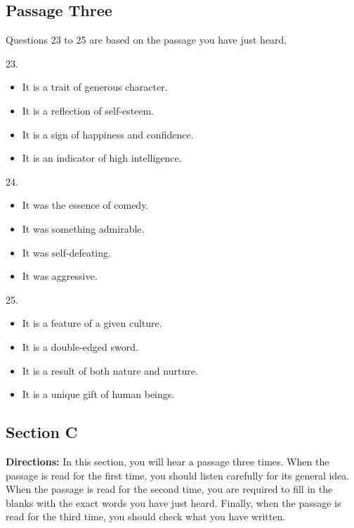 \documentclass[UTF8,11pt]{ctexart}
\begin{document}
\subsection*{Passage Three}


Questions 23 to 25 are based on the passage you have just heard.


23.


\begin{itemize}[leftmargin=2em,itemsep=.2em,topsep=.4em]\item[A.] It is a trait of generous character.
\item[B.] It is a reflection of self-esteem.
\item[C.] It is a sign of happiness and confidence.
\item[D.] It is an indicator of high intelligence.
\end{itemize}

24.


\begin{itemize}[leftmargin=2em,itemsep=.2em,topsep=.4em]\item[A.] It was the essence of comedy.
\item[B.] It was something admirable.
\item[C.] It was self-defeating.
\item[D.] It was aggressive.
\end{itemize}

25.


\begin{itemize}[leftmargin=2em,itemsep=.2em,topsep=.4em]\item[A.] It is a feature of a given culture.
\item[B.] It is a double-edged sword.
\item[C.] It is a result of both nature and nurture.
\item[D.] It is a unique gift of human beings.
\end{itemize}

\subsection*{\textbf{Section C}}


\textbf{Directions:} In this section, you will hear a passage three times. When the passage is read for the first time, you should listen carefully for its general idea. When the passage is read for the second time, you are required to fill in the blanks with the exact words you have just heard. Finally, when the passage is read for the third time, you should check what you have written.
\end{document}

